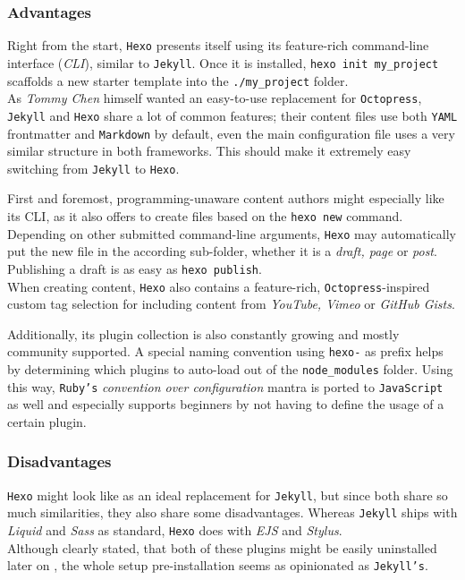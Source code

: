 \subsubsection{Advantages}
Right from the start, \texttt{Hexo} presents itself using its feature-rich command-line interface (\emph{CLI}), similar to \texttt{Jekyll}. Once it is installed, \texttt{hexo init my\_project} scaffolds a new starter template into the \texttt{./my\_project} folder.\\
As \emph{Tommy Chen} himself wanted an easy-to-use replacement for \texttt{Octopress}, \texttt{Jekyll} and \texttt{Hexo} share a lot of common features; their content files use both \texttt{YAML} frontmatter and \texttt{Markdown} by default, even the main configuration file uses a very similar structure in both frameworks. This should make it extremely easy switching from \texttt{Jekyll} to \texttt{Hexo}.

First and foremost, programming-unaware content authors might especially like its CLI, as it also offers to create files based on the \texttt{hexo new} command. Depending on other submitted command-line arguments, \texttt{Hexo} may automatically put the new file in the according sub-folder, whether it is a \emph{draft, page} or \emph{post}. Publishing a draft is as easy as \texttt{hexo publish}.\\
When creating content, \texttt{Hexo} also contains a feature-rich, \texttt{Octopress}-inspired custom tag selection for including content from \emph{YouTube, Vimeo} or \emph{GitHub Gists}.

Additionally, its plugin collection is also constantly growing and mostly community supported. A special naming convention using \texttt{hexo-} as prefix helps by determining which plugins to auto-load out of the \texttt{node\_modules} folder. Using this way, \texttt{Ruby's} \emph{convention over configuration} mantra is ported to \texttt{JavaScript} as well and especially supports beginners by not having to define the usage of a certain plugin.

\subsubsection{Disadvantages}
\texttt{Hexo} might look like as an ideal replacement for \texttt{Jekyll}, but since both share so much similarities, they also share some disadvantages. Whereas \texttt{Jekyll} ships with \emph{Liquid} and \emph{Sass} as standard, \texttt{Hexo} does with \emph{EJS} and \emph{Stylus}.\\
Although clearly stated, that both of these plugins might be easily uninstalled later on \cite{HexoDocumentationSetup}, the whole setup pre-installation seems as opinionated as \texttt{Jekyll's}.

